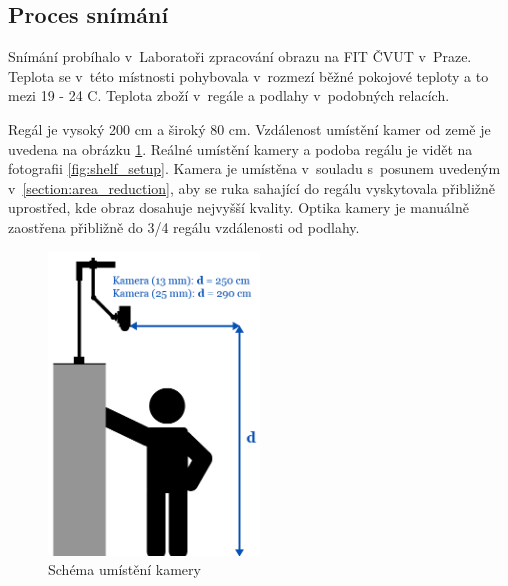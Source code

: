   	\subsection{Proces snímání}
 	Snímání probíhalo v~Laboratoři zpracování obrazu na FIT ČVUT v~Praze. Teplota se v~této místnosti pohybovala v~rozmezí běžné pokojové teploty a to mezi 19 - 24 \textdegree{}C. Teplota zboží v~regále a podlahy v~podobných relacích. 
 
	Regál je vysoký 200 cm a široký 80 cm. Vzdálenost umístění kamer od země je uvedena na obrázku \ref{fig:shelf_scheme}. Reálné umístění kamery a podoba regálu je vidět na fotografii \ref{fig:shelf_setup}. Kamera je umístěna v~souladu s~posunem uvedeným v~\ref{section:area_reduction}, aby se ruka sahající do regálu vyskytovala přibližně uprostřed, kde obraz dosahuje nejvyšší kvality. Optika kamery je manuálně zaostřena přibližně do 3/4 regálu vzdálenosti od podlahy. 

  \begin{figure}[h]
    \centering
    \includegraphics[width=0.5\textwidth]{images/camera_setup_scheme.png}
    \caption{Schéma umístění kamery}
    \label{fig:shelf_scheme}
  \end{figure}  

